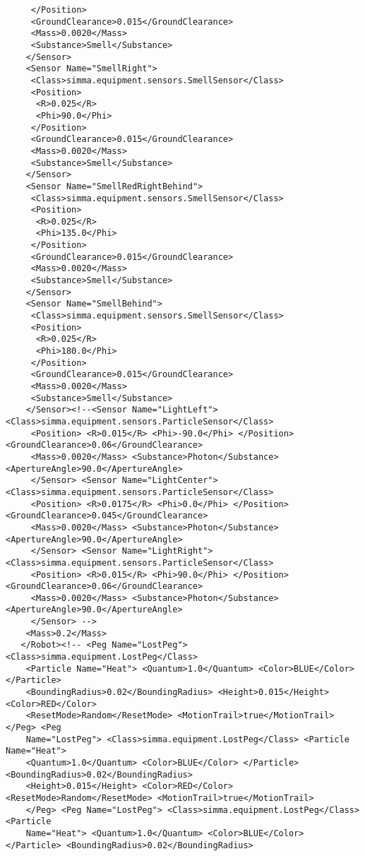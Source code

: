 \documentclass[12pt,fleqn,a4paper]{article}
\begin{document}
\begin{lstlisting}
     </Position>
     <GroundClearance>0.015</GroundClearance>
     <Mass>0.0020</Mass>
     <Substance>Smell</Substance>
    </Sensor>
    <Sensor Name="SmellRight">
     <Class>simma.equipment.sensors.SmellSensor</Class>
     <Position>
      <R>0.025</R>
      <Phi>90.0</Phi>
     </Position>
     <GroundClearance>0.015</GroundClearance>
     <Mass>0.0020</Mass>
     <Substance>Smell</Substance>
    </Sensor>
    <Sensor Name="SmellRedRightBehind">
     <Class>simma.equipment.sensors.SmellSensor</Class>
     <Position>
      <R>0.025</R>
      <Phi>135.0</Phi>
     </Position>
     <GroundClearance>0.015</GroundClearance>
     <Mass>0.0020</Mass>
     <Substance>Smell</Substance>
    </Sensor>
    <Sensor Name="SmellBehind">
     <Class>simma.equipment.sensors.SmellSensor</Class>
     <Position>
      <R>0.025</R>
      <Phi>180.0</Phi>
     </Position>
     <GroundClearance>0.015</GroundClearance>
     <Mass>0.0020</Mass>
     <Substance>Smell</Substance>
    </Sensor><!--<Sensor Name="LightLeft"> <Class>simma.equipment.sensors.ParticleSensor</Class> 
     <Position> <R>0.015</R> <Phi>-90.0</Phi> </Position> <GroundClearance>0.06</GroundClearance> 
     <Mass>0.0020</Mass> <Substance>Photon</Substance> <ApertureAngle>90.0</ApertureAngle> 
     </Sensor> <Sensor Name="LightCenter"> <Class>simma.equipment.sensors.ParticleSensor</Class> 
     <Position> <R>0.0175</R> <Phi>0.0</Phi> </Position> <GroundClearance>0.045</GroundClearance> 
     <Mass>0.0020</Mass> <Substance>Photon</Substance> <ApertureAngle>90.0</ApertureAngle> 
     </Sensor> <Sensor Name="LightRight"> <Class>simma.equipment.sensors.ParticleSensor</Class> 
     <Position> <R>0.015</R> <Phi>90.0</Phi> </Position> <GroundClearance>0.06</GroundClearance> 
     <Mass>0.0020</Mass> <Substance>Photon</Substance> <ApertureAngle>90.0</ApertureAngle> 
     </Sensor> -->
    <Mass>0.2</Mass>
   </Robot><!-- <Peg Name="LostPeg"> <Class>simma.equipment.LostPeg</Class> 
    <Particle Name="Heat"> <Quantum>1.0</Quantum> <Color>BLUE</Color> </Particle> 
    <BoundingRadius>0.02</BoundingRadius> <Height>0.015</Height> <Color>RED</Color> 
    <ResetMode>Random</ResetMode> <MotionTrail>true</MotionTrail> </Peg> <Peg 
    Name="LostPeg"> <Class>simma.equipment.LostPeg</Class> <Particle Name="Heat"> 
    <Quantum>1.0</Quantum> <Color>BLUE</Color> </Particle> <BoundingRadius>0.02</BoundingRadius> 
    <Height>0.015</Height> <Color>RED</Color> <ResetMode>Random</ResetMode> <MotionTrail>true</MotionTrail> 
    </Peg> <Peg Name="LostPeg"> <Class>simma.equipment.LostPeg</Class> <Particle 
    Name="Heat"> <Quantum>1.0</Quantum> <Color>BLUE</Color> </Particle> <BoundingRadius>0.02</BoundingRadius> 

\end{lstlisting}
\end{document}
